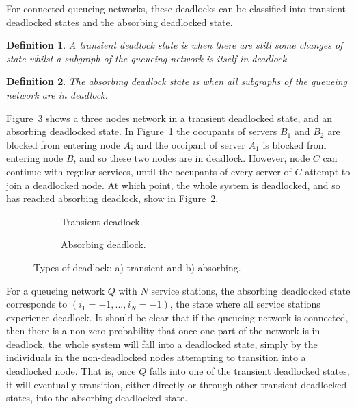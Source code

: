 \documentclass{article}
\newtheorem{definition}{Definition}
\begin{document}
For connected queueing networks, these deadlocks can be classified into transient deadlocked states and the absorbing deadlocked state.\\


\begin{definition}
    A transient deadlock state is when there are still some changes of state
    whilst a subgraph of the queueing network is itself in deadlock.\\
\end{definition}

\begin{definition}
    The absorbing deadlock state is when all subgraphs of the
    queueing network are in deadlock.\\
\end{definition}

Figure~\ref{fig:transabsorb} shows a three nodes network in a transient deadlocked state, and an absorbing deadlocked state.
In Figure~\ref{fig:trans} the occupants of servers $B_1$ and $B_2$ are blocked from entering node $A$; and the occipant of server $A_1$ is blocked from entering node $B$, and so these two nodes are in deadlock.
However, node $C$ can continue with regular services, until the occupants of every server of $C$ attempt to join a deadlocked node.
At which point, the whole system is deadlocked, and so has reached absorbing deadlock, show in Figure~\ref{fig:absorb}.

\begin{figure}[H]
\begin{subfigure}[b]{0.5\textwidth}
  
  \caption{Transient deadlock.}
  \label{fig:trans}
\end{subfigure}
\begin{subfigure}[b]{0.5\textwidth}
  
  \caption{Absorbing deadlock.}
  \label{fig:absorb}
\end{subfigure}
\caption{Types of deadlock: a) transient and b) absorbing.}
\label{fig:transabsorb}
\end{figure}

For a queueing network $Q$ with $N$ service stations, the absorbing deadlocked state corresponds to $(i_1=-1,...,i_N=-1)$, the state where all service stations experience deadlock.
It should be clear that if the queueing network is connected, then there is a non-zero probability that once one part of the network is in deadlock, the whole system will fall into a deadlocked state, simply by the individuals in the non-deadlocked nodes attempting to transition into a deadlocked node.
That is, once $Q$ falls into one of the transient deadlocked states, it will eventually transition, either directly or through other transient deadlocked states, into the absorbing deadlocked state.
\end{document}
